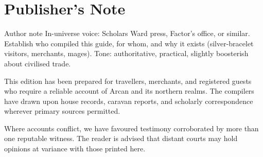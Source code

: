 \chapter{Publisher's Note}

\begin{DndComment}{Author note}
  In-universe voice: Scholars Ward press, Factor's office, or similar.
  Establish who compiled this guide, for whom, and why it exists (silver-bracelet visitors, merchants, mages).
  Tone: authoritative, practical, slightly boosterish about civilised trade.
\end{DndComment}

This edition has been prepared for travellers, merchants, and registered guests who require a reliable account of Arcan and its northern realms. The compilers have drawn upon house records, caravan reports, and scholarly correspondence wherever primary sources permitted.

Where accounts conflict, we have favoured testimony corroborated by more than one reputable witness. The reader is advised that distant courts may hold opinions at variance with those printed here.

